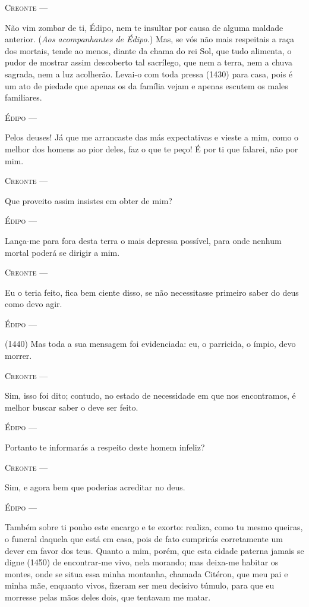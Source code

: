 \textsc{Creonte} ---

Não vim zombar de ti, Édipo, nem te insultar por causa de alguma maldade
anterior. (\emph{Aos acompanhantes de Édipo.}) Mas, se vós não mais
respeitais a raça dos mortais, tende ao menos, diante da chama do rei
Sol, que tudo alimenta, o pudor de mostrar assim descoberto tal
sacrílego, que nem a terra, nem a chuva sagrada, nem a luz acolherão.
Levai-o com toda pressa (1430) para casa, pois é um ato de piedade que
apenas os da família vejam e apenas escutem os males familiares.

\textsc{Édipo} ---

Pelos deuses! Já que me arrancaste das más expectativas e vieste a mim,
como o melhor dos homens ao pior deles, faz o que te peço! É por ti que
falarei, não por mim.

\textsc{Creonte} ---

Que proveito assim insistes em obter de mim?

\textsc{Édipo} ---

Lança-me para fora desta terra o mais depressa possível, para onde
nenhum mortal poderá se dirigir a mim.

\textsc{Creonte} ---

Eu o teria feito, fica bem ciente disso, se não necessitasse primeiro
saber do deus como devo agir.

\textsc{Édipo} ---

(1440) Mas toda a sua mensagem foi evidenciada: eu, o parricida, o
ímpio, devo morrer.

\textsc{Creonte} ---

Sim, isso foi dito; contudo, no estado de necessidade em que nos
encontramos, é melhor buscar saber o deve ser feito.

\textsc{Édipo} ---

Portanto te informarás a respeito deste homem infeliz?

\textsc{Creonte} ---

Sim, e agora bem que poderias acreditar no deus.

\textsc{Édipo} ---

Também sobre ti ponho este encargo e te exorto: realiza, como tu mesmo
queiras, o funeral daquela que está em casa, pois de fato cumprirás
corretamente um dever em favor dos teus. Quanto a mim, porém, que esta
cidade paterna jamais se digne (1450) de encontrar-me vivo, nela
morando; mas deixa-me habitar os montes, onde se situa essa minha
montanha, chamada Citéron, que meu pai e minha mãe, enquanto vivos,
fizeram ser meu decisivo túmulo, para que eu morresse pelas mãos deles
dois, que tentavam me matar.

